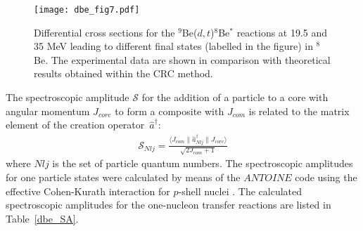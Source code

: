 \documentclass[
12pt, %
oneside, %
english, %
onehalfspacing, %
onehalfspacing, %
headsepline, %
]{MastersDoctoralThesis} %
\begin{document}
\begin{figure}[tp]
\centering
\texttt{[image: dbe\_fig7.pdf]}
\decoRule
\caption{
\label{dbe_fig7}
\footnotesize Differential cross sections for the ${}^9$Be($d,t$)${}^{8}$Be$^*$ reactions at 19.5 and 35 MeV leading to different final states (labelled in the figure) in ${}^{8}$Be. The experimental data are shown in comparison with  theoretical results obtained within the CRC method.}
\end{figure}

The spectroscopic amplitude  $\mathcal{S}$ for the addition of a particle to a core with angular momentum $J_{core}$ to form a composite with $J_{com}$ is related to the matrix element of the creation operator~$\hat{a}^\dagger$:
\begin{eqnarray}\label{eq:SA}
\mathcal{S}_{Nlj} = \frac{\langle J_{com} \| \hat{a}^\dagger _{Nlj} \| J_{core}  \rangle}{\sqrt{2J_{com}+1}}
\end{eqnarray}
where $Nlj$ is the set of particle quantum numbers. The spectroscopic amplitudes for one particle states were calculated by means of the $ANTOINE$ code \cite{antoine}  using the effective Cohen-Kurath interaction for $p$-shell nuclei \cite{cohen1965}. The calculated spectroscopic amplitudes for the one-nucleon transfer reactions are listed in Table~\ref{dbe_SA}.
\end{document}
